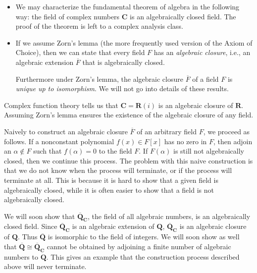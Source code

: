 \documentclass[11pt]{article}
\newcommand{\R}{\mathbf{R}}
\newcommand{\Q}{\mathbf{Q}}
\newcommand{\C}{\mathbf{C}}
\newcommand{\df}[1]{\textit{\textsf{#1}}}
\newcommand{\clos}[1]{\overline{#1}}
\renewcommand{\simeq}{\cong}
\begin{document}
\begin{itemize}
    \item We may characterize the fundamental theorem of algebra in the following way: the field of complex numbers $\C$ is an algebraically closed field. The proof of the theorem is left to a complex analysis class.
    \item If we assume Zorn's lemma (the more frequently used version of the Axiom of Choice), then we can state that every field $F$ has an \df{algebraic closure}, i.e., an algebraic extension $\clos{F}$ that is algebraically closed.
    
    Furthermore under Zorn's lemma, the algebraic closure $\clos{F}$ of a field $F$ is \emph{unique up to isomorphism}. We will not go into details of these results.
\end{itemize}   
\begin{framed}
    Complex function theory tells us that $\C = \R(i)$ is an algebraic closure of $\R$. Assuming Zorn's lemma ensures the existence of the algebraic closure of any field. 

    Naively to construct an algebraic closure $\clos{F}$ of an arbitrary field $F$, we proceed as follows. If a nonconstant polynomial $f(x) \in F[x]$ has no zero in $F$, then adjoin an $\alpha \notin F$ such that $f(\alpha) = 0$ to the field $F$. If $F(\alpha)$ is still not algebraically closed, then we continue this process. The problem with this naive construction is that we do not know when the process will terminate, or if the process will terminate at all. This is because it is hard to show that a given field is algebraically closed, while it is often easier to show that a field is not algebraically closed. 
    
    We will soon show that $\clos{\Q}_\C$, the field of all algebraic numbers, is an algebraically closed field. Since $\clos{\Q}_\C$ is an algebraic extension of $\Q$, $\clos{\Q}_\C$ is an algebraic closure of $\Q$. Thus $\clos{\Q}$ is isomorphic to the field of integers. We will soon show as well that $\clos{\Q} \simeq \clos{\Q}_\C$ cannot be obtained by adjoining a finite number of algebraic numbers to $\Q$. This gives an example that the construction process described above will never terminate.
\end{framed}
\end{document}
